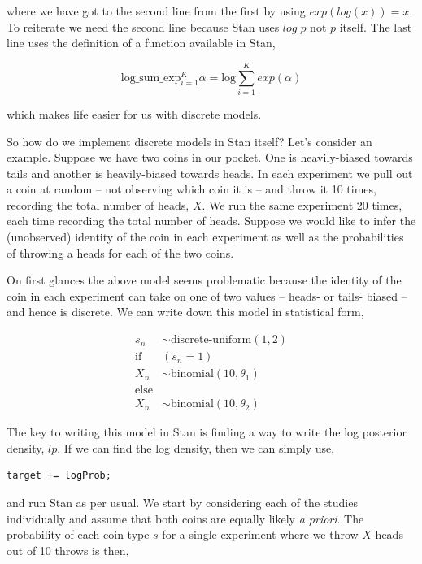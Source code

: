 \documentclass[11pt,fullpage]{book}
\begin{document}
where we have got to the second line from the first by using $exp(log(x)) = x$. To reiterate we need the second line because Stan uses $log \;p$ not $p$ itself. The last line uses the definition of a function available in Stan,

\begin{equation}
\text{log}\_\text{sum}\_\text{exp}_{i=1}^{K} \alpha  = \text{log} \sum_{i=1}^{K} exp\left( \alpha \right)
\end{equation}

which makes life easier for us with discrete models.

So how do we implement discrete models in Stan itself? Let's consider an example. Suppose we have two coins in our pocket. One is heavily-biased towards tails and another is heavily-biased towards heads. In each experiment we pull out a coin at random -- not observing which coin it is -- and throw it 10 times, recording the total number of heads, $X$. We run the same experiment 20 times, each time recording the total number of heads. Suppose we would like to infer the (unobserved) identity of the coin in each experiment as well as the probabilities of throwing a heads for each of the two coins.

On first glances the above model seems problematic because the identity of the coin in each experiment can take on one of two values -- heads- or tails- biased -- and hence is discrete. We can write down this model in statistical form,

\begin{align}
s_n &\sim \text{discrete-uniform}(1,2)\\
\text{if} \;\;\;&(s_n = 1)\\
X_n &\sim \text{binomial}(10,\theta_1)\\
\text{else} &\\
X_n &\sim \text{binomial}(10,\theta_2)
\end{align}

The key to writing this model in Stan is finding a way to write the log posterior density, $lp$. If we can find the log density, then we can simply use,

\begin{verbatim}
target += logProb;
\end{verbatim}

and run Stan as per usual. We start by considering each of the studies individually and assume that both coins are equally likely \textit{a priori}. The probability of each coin type $s$ for a single experiment where we throw $X$ heads out of 10 throws is then,
\end{document}

